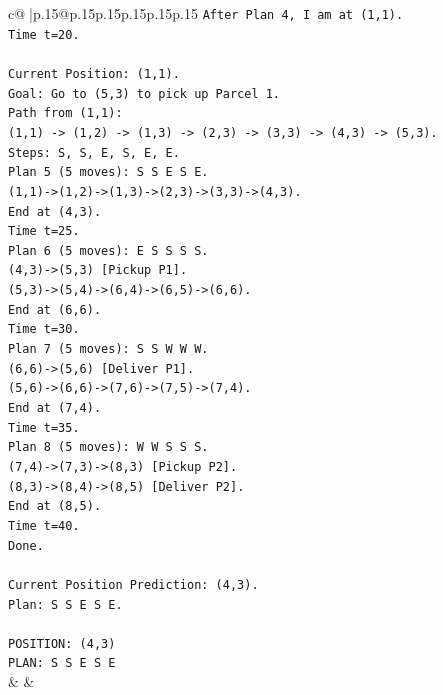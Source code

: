 \documentclass{article}
\begin{document}
{\begin{supertabular}{c@{$\;$}|p{.15\linewidth}@{}p{.15\linewidth}p{.15\linewidth}p{.15\linewidth}p{.15\linewidth}p{.15\linewidth}}
{{{\texttt{After Plan 4, I am at (1,1).} \\
\texttt{Time t=20.} \\
\\ 
\texttt{Current Position: (1,1).} \\
\texttt{Goal: Go to (5,3) to pick up Parcel 1.} \\
\texttt{Path from (1,1):} \\
\texttt{(1,1) {-}> (1,2) {-}> (1,3) {-}> (2,3) {-}> (3,3) {-}> (4,3) {-}> (5,3).} \\
\texttt{Steps: S, S, E, S, E, E.} \\
\texttt{Plan 5 (5 moves): S S E S E.} \\
\texttt{(1,1){-}>(1,2){-}>(1,3){-}>(2,3){-}>(3,3){-}>(4,3).} \\
\texttt{End at (4,3).} \\
\texttt{Time t=25.} \\
\texttt{Plan 6 (5 moves): E S S S S.} \\
\texttt{(4,3){-}>(5,3) {[}Pickup P1{]}.} \\
\texttt{(5,3){-}>(5,4){-}>(6,4){-}>(6,5){-}>(6,6).} \\
\texttt{End at (6,6).} \\
\texttt{Time t=30.} \\
\texttt{Plan 7 (5 moves): S S W W W.} \\
\texttt{(6,6){-}>(5,6) {[}Deliver P1{]}.} \\
\texttt{(5,6){-}>(6,6){-}>(7,6){-}>(7,5){-}>(7,4).} \\
\texttt{End at (7,4).} \\
\texttt{Time t=35.} \\
\texttt{Plan 8 (5 moves): W W S S S.} \\
\texttt{(7,4){-}>(7,3){-}>(8,3) {[}Pickup P2{]}.} \\
\texttt{(8,3){-}>(8,4){-}>(8,5) {[}Deliver P2{]}.} \\
\texttt{End at (8,5).} \\
\texttt{Time t=40.} \\
\texttt{Done.} \\
\\ 
\texttt{Current Position Prediction: (4,3).} \\
\texttt{Plan: S S E S E.} \\
\\ 
\texttt{POSITION: (4,3)} \\
\texttt{PLAN: S S E S E} \\
            }
        }
    }
    & & \\ \\


\end{supertabular}}
\end{document}
